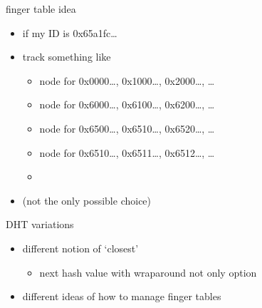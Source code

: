 \begin{frame}{finger table idea}
    \begin{itemize}
    \item if my ID is 0x65a1fc\ldots
    \item track something like
        \begin{itemize}
        \item node for 0x0000\ldots, 0x1000\ldots, 0x2000\ldots, \ldots
        \item node for 0x6000\ldots, 0x6100\ldots, 0x6200\ldots, \ldots
        \item node for 0x6500\ldots, 0x6510\ldots, 0x6520\ldots, \ldots
        \item node for 0x6510\ldots, 0x6511\ldots, 0x6512\ldots, \ldots
        \item \lots
        \end{itemize}
    \item (not the only possible choice)
    \end{itemize}
\end{frame}

\begin{frame}{DHT variations}
    \begin{itemize}
    \item different notion of `closest' 
        \begin{itemize}
        \item next hash value with wraparound not only option
        \end{itemize}
    \item different ideas of how to manage finger tables
    \end{itemize}
\end{frame}
